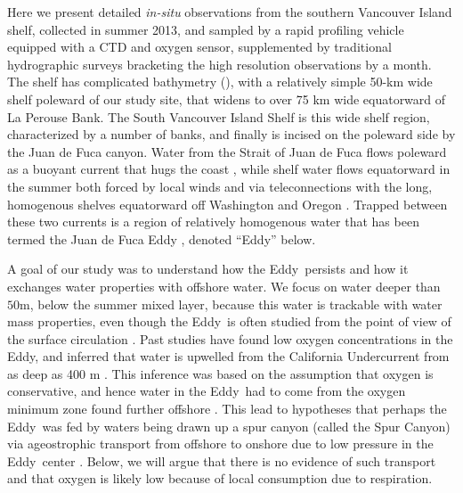 \documentclass[draft]{agujournal2019}
\newcommand*{\Eddy}{{\sc Eddy}}
\begin{document}
Here we present detailed \emph{in-situ} observations from the southern Vancouver Island shelf, collected in summer 2013, and sampled by a rapid profiling vehicle equipped with a CTD and oxygen sensor, supplemented by traditional hydrographic surveys bracketing the high resolution observations by a month. The shelf has complicated bathymetry (), with a relatively simple 50-km wide shelf poleward of our study site, that widens to over 75 km wide equatorward of La Perouse Bank.  The South Vancouver Island Shelf is this wide shelf region, characterized by a number of banks, and finally is incised on the poleward side by the Juan de Fuca canyon.   Water from the Strait of Juan de Fuca flows poleward as a buoyant current that hugs the coast \cite{thomsonetal89, hickeyetal91}, while shelf water flows equatorward in the summer both forced by local winds and via teleconnections with the long, homogenous shelves equatorward off Washington and Oregon \cite{hickeyetal91,thomsonkrassovski15,engidaetal16}.  Trapped between these two currents is a region of relatively homogenous water that has been termed the Juan de Fuca Eddy \cite{freelanddenman82,freelandmcintosh89,foremanetal07,macfadyenhickey10}, denoted ``\Eddy'' below.

A goal of our study was to understand how the \Eddy\ persists and how it exchanges water properties with offshore water.  We focus on water deeper than $50 \mathrm{m}$, below the summer mixed layer, because this water is trackable with water mass properties, even though the \Eddy\ is often studied from the point of view of the surface circulation \cite{macfadyenhickey10}.  Past studies have found low oxygen concentrations in the \Eddy, and inferred that water is upwelled from the California Undercurrent from as deep as 400 m \cite{freelanddenman82,deweycrawford88}.  This inference was based on the assumption that oxygen is conservative, and hence water in the \Eddy\ had to come from  the oxygen minimum zone found further offshore \cite{mackasetal87}.  This lead to hypotheses that perhaps the \Eddy\ was fed by waters being drawn up a spur canyon (called the Spur Canyon) via ageostrophic transport from offshore to onshore due to low pressure in the \Eddy\ center \cite{weaverhsieh87}.  Below, we will argue that there is no evidence of such transport and that oxygen is likely low because of local consumption due to respiration.
\end{document}
